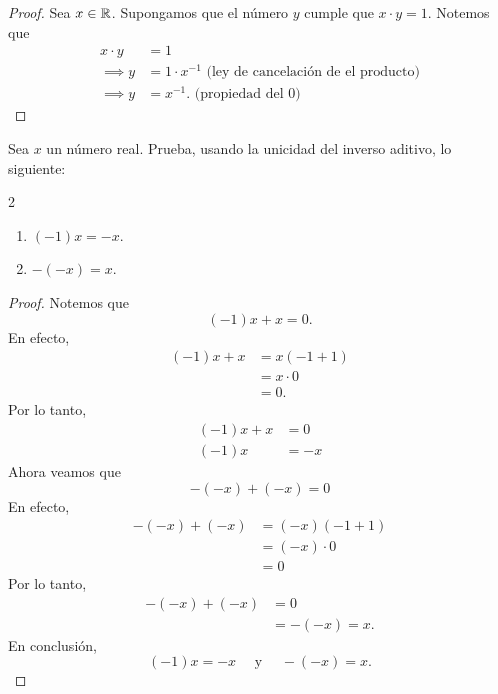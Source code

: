 \documentclass[12pt,a4paper]{book}
\begin{document}
    \begin{proof}
        Sea $x\in\mathbb{R}$. Supongamos que el número $y$ cumple que $x\cdot y=1$. Notemos que
        \begin{align*}
            x\cdot y&=1\\
            \implies y&=1\cdot x^{-1}\text{ (ley de cancelación de el producto)}\\
            \implies y&=x^{-1}.\text{ (propiedad del 0)}
        \end{align*}
    \end{proof}

    \begin{ejercicio}
        Sea $x$ un número real. Prueba, usando la unicidad del inverso aditivo, lo siguiente:
        \begin{multicols}{2}
            \begin{enumerate}
                \item[(a)] $(-1)x=-x$.
                \item[(b)] $-(-x)=x$. 
            \end{enumerate}
        \end{multicols}
    \end{ejercicio}

    \begin{proof}
        Notemos que
        \begin{equation*}
            (-1)x+x=0.
        \end{equation*}
        En efecto,
        \begin{align*}
            (-1)x+x&=x(-1+1)\\
            &=x\cdot0\\
            &=0.
        \end{align*}
        Por lo tanto,
        \begin{align*}
            (-1)x+x&=0\\
            (-1)x&=-x
        \end{align*}
        Ahora veamos que
        \begin{equation*}
            -(-x)+(-x)=0
        \end{equation*}
        En efecto,
        \begin{align*}
            -(-x)+(-x)&=(-x)(-1+1)\\
            &=(-x)\cdot0\\
            &=0
        \end{align*}
        Por lo tanto,
        \begin{align*}
            -(-x)+(-x)&=0\\
            &=-(-x)=x.
        \end{align*}
        En conclusión,
        \begin{equation*}
            (-1)x=-x\quad\text{ y }\quad-(-x)=x.
        \end{equation*}
    \end{proof}
\end{document}
